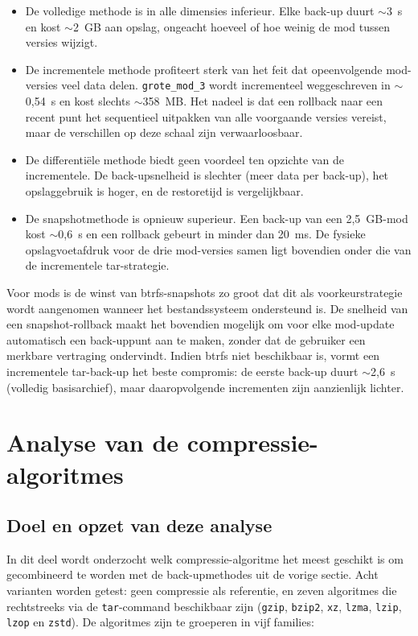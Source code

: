 \begin{itemize}
    \item De volledige methode is in alle dimensies inferieur. Elke back-up duurt $\sim$3~s en kost $\sim$2~GB aan opslag, ongeacht hoeveel of hoe weinig de mod tussen versies wijzigt.
    \item De incrementele methode profiteert sterk van het feit dat opeenvolgende mod-versies veel data delen. \texttt{grote\_mod\_3} wordt incrementeel weggeschreven in $\sim$0{,}54~s en kost slechts $\sim$358~MB. Het nadeel is dat een rollback naar een recent punt het sequentieel uitpakken van alle voorgaande versies vereist, maar de verschillen op deze schaal zijn verwaarloosbaar.
    \item De differentiële methode biedt geen voordeel ten opzichte van de incrementele. De back-upsnelheid is slechter (meer data per back-up), het opslaggebruik is hoger, en de restoretijd is vergelijkbaar.
    \item De snapshotmethode is opnieuw superieur. Een back-up van een 2{,}5~GB-mod kost $\sim$0{,}6~s en een rollback gebeurt in minder dan 20~ms. De fysieke opslagvoetafdruk voor de drie mod-versies samen ligt bovendien onder die van de incrementele tar-strategie.
\end{itemize}

Voor mods is de winst van btrfs-snapshots zo groot dat dit als voorkeur\-strategie wordt aangenomen wanneer het bestandssysteem ondersteund is. De snelheid van een snapshot-rollback maakt het bovendien mogelijk om voor elke mod-update automatisch een back-up\-punt aan te maken, zonder dat de gebruiker een merkbare vertraging ondervindt. Indien btrfs niet beschikbaar is, vormt een incrementele tar-back-up het beste compromis: de eerste back-up duurt $\sim$2{,}6~s (volledig basisarchief), maar daaropvolgende incrementen zijn aanzienlijk lichter.


\section{Analyse van de compressie-algoritmes}
\label{sec:compressie}

\subsection{Doel en opzet van deze analyse}

In dit deel wordt onderzocht welk compressie-algoritme het meest geschikt is om gecombineerd te worden met de back-upmethodes uit de vorige sectie. Acht varianten worden getest: geen compressie als referentie, en zeven algoritmes die rechtstreeks via de \texttt{tar}-command beschikbaar zijn (\texttt{gzip}, \texttt{bzip2}, \texttt{xz}, \texttt{lzma}, \texttt{lzip}, \texttt{lzop} en \texttt{zstd}). De algoritmes zijn te groeperen in vijf families:

